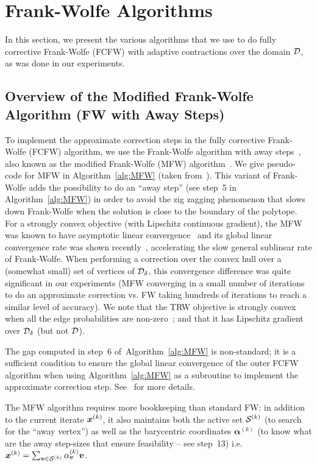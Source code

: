 \section{Frank-Wolfe Algorithms} \label{sec:FW_alg}

In this section, we present the various algorithms that we use to do fully corrective Frank-Wolfe (FCFW) with adaptive contractions over the domain $\mathcal{D}$, as was done in our experiments. 

\subsection{Overview of the Modified Frank-Wolfe Algorithm (FW with Away Steps)}
To implement the approximate correction steps in the fully corrective Frank-Wolfe (FCFW) algorithm, we use the Frank-Wolfe algorithm with away steps~, also known as the modified Frank-Wolfe (MFW) algorithm~. 
We give pseudo-code for MFW in Algorithm~\ref{alg:MFW} (taken from~\citep{lacoste2015MFW}). 
This variant of Frank-Wolfe adds the possibility to do an ``away step'' (see step~5 in Algorithm~\ref{alg:MFW}) in order to avoid the zig zagging phenomenon that slows down Frank-Wolfe when the solution is close to the boundary of the polytope. 
For a strongly convex objective (with Lipschitz continuous gradient), the MFW was known to have asymptotic linear convergence~ and its global linear convergence rate was shown recently~\citep{lacoste2015MFW}, accelerating the slow general sublinear rate of Frank-Wolfe. 
When performing a correction over the convex hull over a (somewhat small) set of vertices of $\mathcal{D}_{\delta}$, this convergence difference was quite significant in our experiments (MFW converging in a small number of iterations to do an approximate correction vs. FW taking hundreds of iterations to reach a similar level of accuracy). 
We note that the TRW objective is strongly convex when all the edge probabilities are non-zero~\citep{wainwright2005new}; and that it has Lipschitz gradient over $\mathcal{D}_{\delta}$ (but not $\mathcal{D}$).

The gap computed in step~6 of~Algorithm~\ref{alg:MFW} is non-standard; it is a sufficient condition to ensure the global linear convergence of the outer FCFW algorithm when using Algorithm~\ref{alg:MFW} as a subroutine to implement the approximate correction step. See~\citet{lacoste2015MFW} for more details.

The MFW algorithm requires more bookkeeping than standard FW: in addition to the current iterate $\bm{x}^{(k)}$, it also maintains both the active set $\mathcal{S}^{(k)}$ (to search for the ``away vertex'') as well as the barycentric coordinates $\bm{\alpha}^{(k)}$ (to know what are the away step-sizes that ensure feasibility -- see step~13) i.e. $\bm{x}^{(k)}= \sum_{\bm{v} \in \mathcal{S}^{(k)}} \alpha^{(k)}_{\bm{v}} \bm{v}$.

